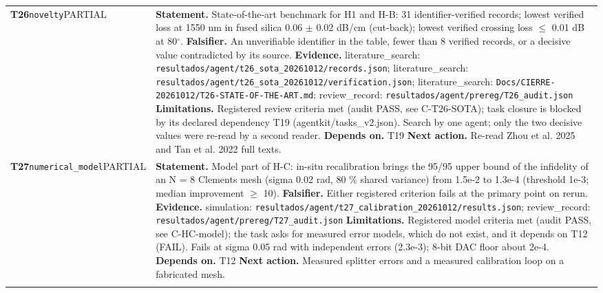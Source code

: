 \begin{longtable}{@{}>{\raggedright\arraybackslash}p{2.35cm}>{\raggedright\arraybackslash}p{13.2cm}@{}}
\textbf{T26}\newline \texttt{novelty}\newline PARTIAL & \textbf{Statement.} State-of-the-art benchmark for H1 and H-B: 31 identifier-verified records; lowest verified loss at 1550 nm in fused silica 0.06 $\pm$ 0.02 dB/\allowbreak{}cm (cut-back); lowest verified crossing loss $\le$ 0.01 dB at 80$^\circ$. \newline \textbf{Falsifier.} An unverifiable identifier in the table, fewer than 8 verified records, or a decisive value contradicted by its source. \newline \textbf{Evidence.} literature\_\allowbreak{}search: \texttt{resultados/\allowbreak{}agent/\allowbreak{}t26\_\allowbreak{}sota\_\allowbreak{}20261012/\allowbreak{}records.json}; literature\_\allowbreak{}search: \texttt{resultados/\allowbreak{}agent/\allowbreak{}t26\_\allowbreak{}sota\_\allowbreak{}20261012/\allowbreak{}verification.json}; literature\_\allowbreak{}search: \texttt{Docs/\allowbreak{}CIERRE-20261012/\allowbreak{}T26-STATE-OF-THE-ART.md}; review\_\allowbreak{}record: \texttt{resultados/\allowbreak{}agent/\allowbreak{}prereg/\allowbreak{}T26\_\allowbreak{}audit.json} \newline \textbf{Limitations.} Registered review criteria met (audit PASS, see C-T26-SOTA); task closure is blocked by its declared dependency T19 (agentkit/\allowbreak{}tasks\_\allowbreak{}v2.json). Search by one agent; only the two decisive values were re-read by a second reader. \newline \textbf{Depends on.} T19 \newline \textbf{Next action.} Re-read Zhou et al. 2025 and Tan et al. 2022 full texts. \\ \addlinespace[2pt]
\textbf{T27}\newline \texttt{numerical\_\allowbreak{}model}\newline PARTIAL & \textbf{Statement.} Model part of H-C: in-situ recalibration brings the 95/\allowbreak{}95 upper bound of the infidelity of an N = 8 Clements mesh (sigma 0.02 rad, 80 \% shared variance) from 1.5e-2 to 1.3e-4 (threshold 1e-3; median improvement $\ge$ 10). \newline \textbf{Falsifier.} Either registered criterion fails at the primary point on rerun. \newline \textbf{Evidence.} simulation: \texttt{resultados/\allowbreak{}agent/\allowbreak{}t27\_\allowbreak{}calibration\_\allowbreak{}20261012/\allowbreak{}results.json}; review\_\allowbreak{}record: \texttt{resultados/\allowbreak{}agent/\allowbreak{}prereg/\allowbreak{}T27\_\allowbreak{}audit.json} \newline \textbf{Limitations.} Registered model criteria met (audit PASS, see C-HC-model); the task asks for measured error models, which do not exist, and it depends on T12 (FAIL). Fails at sigma 0.05 rad with independent errors (2.3e-3); 8-bit DAC floor about 2e-4. \newline \textbf{Depends on.} T12 \newline \textbf{Next action.} Measured splitter errors and a measured calibration loop on a fabricated mesh. \\ \addlinespace[2pt]

\end{longtable}

